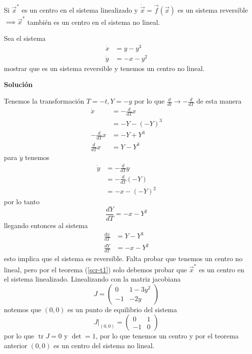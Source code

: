 \begin{tcolorbox}[colback=Black!4, colframe=White,arc=2mm]
\begin{teorema}\label{scr-t1}  Si $\vec{x}^*$ es un centro en el sistema linealizado y $\dot{\vec{x}} = \vec{f}(\vec{x})$ es un sistema reversible $ \implies \vec{x}^*$ también es un centro en el sistema no lineal. 
\end{teorema} 
\end{tcolorbox}

\begin{ejemplo} \label{scr-ej2}  Sea el sistema
\begin{align*}
  \dot{x} &= y - y^3 \\
  \dot{y} &= -x-y^2
\end{align*}  
mostrar que es un sistema reversible y tenemos un centro no lineal.

\textbf{Solución}

Tenemos la transformación $T=-t, Y=-y$ por lo que  $\frac{d}{dt} \to -\frac{d}{dT}$ de esta manera
\begin{align*}
  \dot{x} &= -\frac{d}{dT}x \\
  &= -Y - (-Y)^3 \\
  -\frac{d}{dT}x&= -Y+Y^3  \\
  \frac{d}{dT}x&=Y-Y^3
\end{align*}
para $\dot{y}$ tenemos
\begin{align*}
  \dot{y} &= -\frac{d}{dT}y \\
  &= -\frac{d}{dT}(-Y) \\
  &= -x-(-Y)^2 
\end{align*}
por lo tanto
\begin{equation*}
   \frac{dY}{dT} = -x-Y^2
\end{equation*}
llegando entonces al sistema
\begin{align*}
         \frac{dx}{dT}&=Y-Y^3 \\
     \frac{dY}{dT} &= -x-Y^2
\end{align*}
esto implica que el sistema es reversible. Falta probar que tenemos un centro no lineal, pero por el teorema (\ref{scr-t1}) solo debemos probar que $\vec{x}^*$ es un centro en el sistema linealizado. Linealizando con la matriz jacobiana 
\begin{equation*}
  J = \begin{pmatrix} 0 & 1-3y^2 \\ -1 & -2y \end{pmatrix}  
\end{equation*}
notemos que $(0,0)$ es un punto de equilibrio del sistema
 \begin{equation*}
  \left. J \right|_{(0,0)} = \begin{pmatrix} 0 & 1 \\ -1 & 0 \end{pmatrix}  
\end{equation*}
por lo que $\operatorname{tr}J=0$ y $\operatorname{det}=1$, por lo que tenemos un centro y por el teorema anterior $(0,0)$ es un centro del sistema no lineal.


\end{ejemplo}
